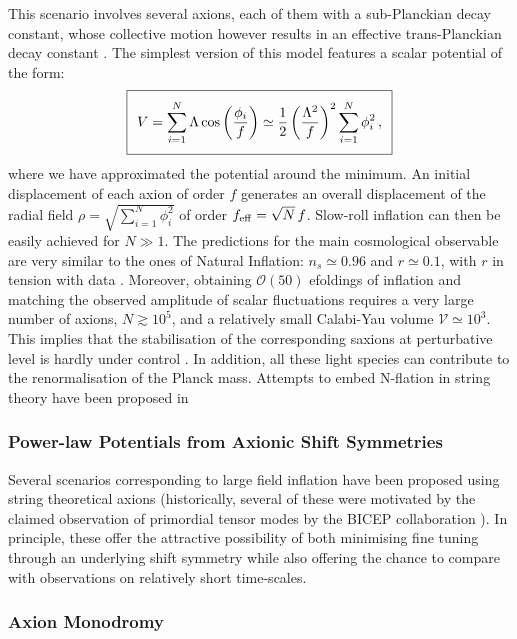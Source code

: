This scenario involves several axions, each of them with a sub-Planckian decay constant, whose collective motion however results in an effective trans-Planckian decay constant \cite{Dimopoulos:2005ac}. The simplest version of this model features a scalar potential of the form:
\begin{equation}
\setlength\fboxsep{0.25cm}
\setlength\fboxrule{0.4pt}
\boxed{
V=\sum_{i=1}^N \Lambda \cos\left(\frac{\phi_i}{f}\right) \simeq \frac12 \left(\frac{\Lambda^2}{f}\right)^2 \sum_{i=1}^N \phi_i^2\,,
}
\end{equation}
where we have approximated the potential around the minimum. An initial displacement of each axion of order $f$ generates an overall displacement of the radial field $\rho= \sqrt{\sum_{i=1}^N \phi_i^2}$ of order $f_{\rm eff}=\sqrt{N}\,f$. Slow-roll inflation can then be easily achieved for $N\gg 1$. The predictions for the main cosmological observable are very similar to the ones of Natural Inflation: $n_s\simeq 0.96$ and $r\simeq 0.1$, with $r$ in tension with data \cite{Kim:2011jea}. Moreover, obtaining $\mathcal{O}(50)$ efoldings of inflation and matching the observed amplitude of scalar fluctuations requires a very large number of axions, $N\gtrsim 10^5$, and a relatively small Calabi-Yau volume $\mathcal{V}\simeq 10^3$. This implies that the stabilisation of the corresponding saxions at perturbative level is hardly under control \cite{Cicoli:2014sva}. In addition, all these light species can contribute to the renormalisation of the Planck mass.  Attempts to embed N-flation in string theory have been proposed in \cite{Easther:2005zr,Grimm:2007hs,Cicoli:2014sva,Grimm:2014vva} 



\subsubsection{Power-law Potentials from Axionic Shift Symmetries}

Several scenarios corresponding to large field inflation have been proposed using string theoretical axions (historically, several of these were motivated by the claimed observation of primordial tensor modes by the BICEP collaboration \cite{BICEP}). In principle, these offer
the attractive possibility of both minimising fine tuning through an underlying shift symmetry while also offering the chance to compare with observations on relatively short time-scales.
 
\subsubsection*{Axion Monodromy}

